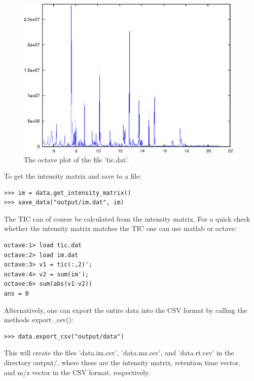 \begin{figure}[htp]
\begin{center}
\includegraphics{graphics/tic.eps}
\caption{The octave plot of the file 'tic.dat'.}
\label{ticplot}
\end{center}
\end{figure}

To get the intensity matrix and save to a file:

\begin{verbatim}
>>> im = data.get_intensity_matrix()
>>> save_data("output/im.dat", im)
\end{verbatim}

\noindent
The TIC can of course be calculated from the intensity matrix. For a quick
check whether the intensity matrix matches the TIC one can use matlab or
octave:

\begin{verbatim}
octave:1> load tic.dat
octave:2> load im.dat
octave:3> v1 = tic(:,2)';
octave:4> v2 = sum(im');
octave:6> sum(abs(v1-v2))
ans = 0
\end{verbatim}

Alternatively, one can export the entire data into the CSV format by
calling the methods export\_csv():

\begin{verbatim}
>>> data.export_csv("output/data")
\end{verbatim}

\noindent
This will create the files 'data.im.csv', 'data.mz.csv', and 'data.rt.csv'
in the directory output/, where these are the intensity matrix, retention
time vector, and m/z vector in the CSV format, respectively.

